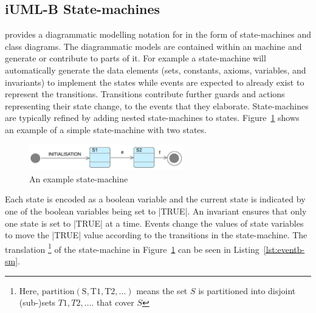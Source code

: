 
\subsection{iUML-B State-machines}
\label{sec:iumlb}

\iUMLB provides a diagrammatic modelling notation for \EventB in the form of state-machines and class diagrams. 
The diagrammatic models are contained within an \EventB machine and generate or contribute to parts of it. 
For example a state-machine will automatically generate the \EventB data elements (sets, constants, axioms, variables, and invariants) to implement the states while \EventB events are expected to already exist to represent the transitions. 
Transitions contribute further guards and actions representing their state change, to the events that they elaborate.  
State-machines are typically refined by adding nested state-machines to states.
Figure~\ref{fig:iumlb-sm} shows an example of a simple state-machine with two states.
\begin{figure}[!h]
	\vspace{-.5cm}
	\centering
	\includegraphics[width=0.6\textwidth]{figures/iumlb-SM}
	\caption{An example \iUMLB state-machine}
	\label{fig:iumlb-sm}
	\vspace{-.5cm}
\end{figure}

Each state is encoded as a boolean variable and the current state is indicated by one of the boolean variables being set to |TRUE|. 
An invariant ensures that only one state is set to |TRUE| at a time.
Events change the values of state variables to move the |TRUE| value according to the transitions in the state-machine.  
The \EventB translation%
%
\footnote{%
  Here, $\mathrm{partition(S, T1, T2, \ldots)}$ means the set $S$ is partitioned into disjoint (sub-)sets $T1, T2, \ldots$.
that cover $S$} %
of the state-machine in Figure~\ref{fig:iumlb-sm} can be seen in Listing~\ref{lst:eventb-sm}.%
	
